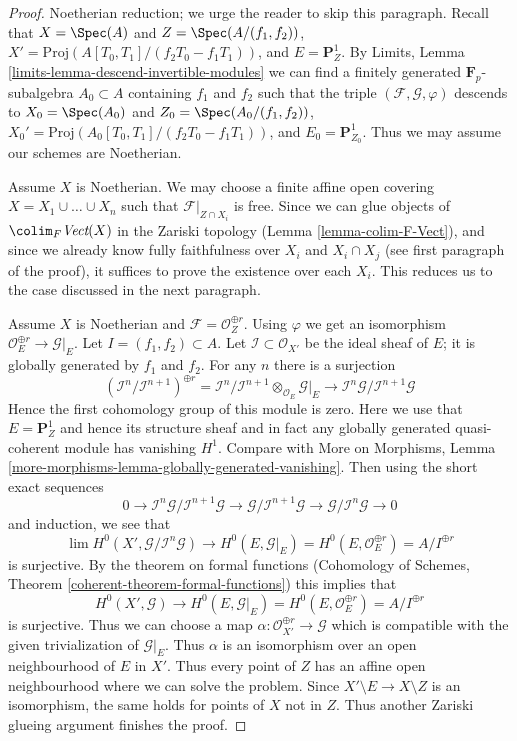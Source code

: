 \begin{proof}
\medskip\noindent
Noetherian reduction; we urge the reader to skip this paragraph.
Recall that $X = \Spec(A)$ and $Z = \Spec(A/(f_1, f_2))$,
$X' = \text{Proj}(A[T_0, T_1]/(f_2T_0 - f_1T_1))$, and
$E = \mathbf{P}^1_Z$. By Limits, Lemma
\ref{limits-lemma-descend-invertible-modules}
we can find a finitely generated $\mathbf{F}_p$-subalgebra
$A_0 \subset A$ containing $f_1$ and $f_2$ such that the triple
$(\mathcal{F}, \mathcal{G}, \varphi)$ descends to
$X_0 = \Spec(A_0)$ and $Z_0 = \Spec(A_0/(f_1, f_2))$,
$X_0' = \text{Proj}(A_0[T_0, T_1]/(f_2T_0 - f_1T_1))$, and
$E_0 = \mathbf{P}^1_{Z_0}$. Thus we may assume our schemes
are Noetherian.

\medskip\noindent
Assume $X$ is Noetherian. We may choose a finite affine open covering
$X = X_1 \cup \ldots \cup X_n$ such that $\mathcal{F}|_{Z \cap X_i}$ is free.
Since we can glue objects of $\colim_F \textit{Vect}(X)$
in the Zariski topology (Lemma \ref{lemma-colim-F-Vect}), and
since we already know
fully faithfulness over $X_i$ and $X_i \cap X_j$ (see first paragraph
of the proof), it suffices to prove the existence over each $X_i$.
This reduces us to the case discussed in the next paragraph.

\medskip\noindent
Assume $X$ is Noetherian and $\mathcal{F} = \mathcal{O}_Z^{\oplus r}$.
Using $\varphi$ we get an isomorphism
$\mathcal{O}_E^{\oplus r} \to \mathcal{G}|_E$.
Let $I = (f_1, f_2) \subset A$.
Let $\mathcal{I} \subset \mathcal{O}_{X'}$
be the ideal sheaf of $E$; it is globally generated by $f_1$ and $f_2$.
For any $n$ there is a surjection
$$
(\mathcal{I}^n/\mathcal{I}^{n + 1})^{\oplus r} =
\mathcal{I}^n/\mathcal{I}^{n + 1} \otimes_{\mathcal{O}_E}
\mathcal{G}|_E \longrightarrow
\mathcal{I}^n\mathcal{G}/\mathcal{I}^{n + 1}\mathcal{G}
$$
Hence the first cohomology group of this module is zero.
Here we use that $E = \mathbf{P}^1_Z$ and hence its structure
sheaf and in fact any globally generated quasi-coherent module
has vanishing $H^1$. Compare with More on Morphisms, Lemma
\ref{more-morphisms-lemma-globally-generated-vanishing}.
Then using the short exact sequences
$$
0 \to  \mathcal{I}^n\mathcal{G}/\mathcal{I}^{n + 1}\mathcal{G} \to
\mathcal{G}/\mathcal{I}^{n + 1}\mathcal{G} \to
\mathcal{G}/\mathcal{I}^n\mathcal{G} \to 0
$$
and induction, we see that
$$
\lim H^0(X', \mathcal{G}/\mathcal{I}^n\mathcal{G})
\to
H^0(E, \mathcal{G}|_E) = H^0(E, \mathcal{O}_E^{\oplus r}) =
A/I^{\oplus r}
$$
is surjective. By the theorem on formal functions
(Cohomology of Schemes, Theorem \ref{coherent-theorem-formal-functions})
this implies that
$$
H^0(X', \mathcal{G}) \to
H^0(E, \mathcal{G}|_E) = H^0(E, \mathcal{O}_E^{\oplus r}) =
A/I^{\oplus r}
$$
is surjective. Thus we can choose a map
$\alpha : \mathcal{O}_{X'}^{\oplus r} \to \mathcal{G}$
which is compatible with the given trivialization
of $\mathcal{G}|_E$. Thus $\alpha$ is an isomorphism over
an open neighbourhood of $E$ in $X'$. Thus every point
of $Z$ has an affine open neighbourhood where
we can solve the problem. Since $X' \setminus E \to X \setminus Z$
is an isomorphism, the same holds for points of $X$ not in $Z$.
Thus another Zariski glueing argument finishes the proof.
\end{proof}
